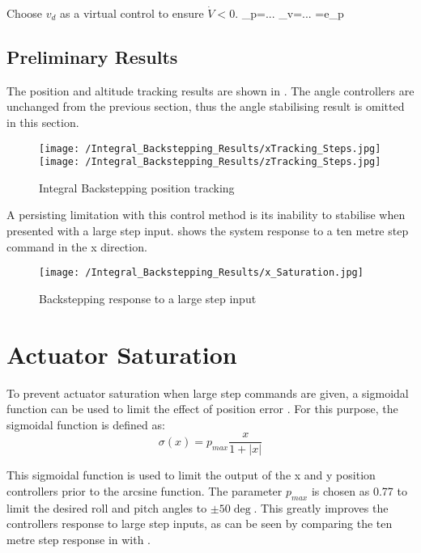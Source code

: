 Choose $v_{d}$ as a virtual control to ensure $\dot{V}<0$.
_{p}=...
_{v}=...
\dot{\Gamma}=e_{p}





\FloatBarrier
\subsection{Preliminary Results}
The position and altitude tracking results are shown in . The angle controllers are unchanged from the previous section, thus the angle stabilising result is omitted in this section.

\begin{figure}[htb]
\begin{center}
	\texttt{[image: /Integral\_Backstepping\_Results/xTracking\_Steps.jpg]}%
	\texttt{[image: /Integral\_Backstepping\_Results/zTracking\_Steps.jpg]}%
	\end{center}
	\caption{Integral Backstepping position tracking}%
	\label{fig:IntBackPos}%
\end{figure}

A persisting limitation with this control method is its inability to stabilise when presented with a large step input.  shows the system response to a ten metre step command in the x direction.

\begin{figure}[htb]
\begin{center}
	\texttt{[image: /Integral\_Backstepping\_Results/x\_Saturation.jpg]}%
	\end{center}
	\caption{Backstepping response to a large step input}%
	\label{fig:IntBackSat}%
\end{figure}
\FloatBarrier
\section{Actuator Saturation}
To prevent actuator saturation when large step commands are given, a sigmoidal function can be used to limit the effect of position error \cite{Cabecinhas2009}. For this purpose, the sigmoidal function is defined as:
\[\sigma(x)=p_{max}\frac{x}{1+|x|}\]

This sigmoidal function is used to limit the output of the x and y position controllers prior to the arcsine function. The parameter $p_{max}$ is chosen as 0.77 to limit the desired roll and pitch angles to $\pm50\deg$.
This greatly improves the controllers response to large step inputs, as can be seen by comparing the ten metre step response in  with .

